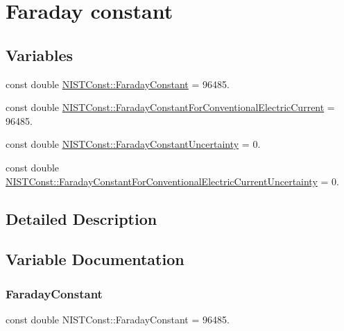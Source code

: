 \hypertarget{group___faraday_constant}{}\section{Faraday constant}
\label{group___faraday_constant}
\subsection*{Variables}
\begin{DoxyCompactItemize}
\item 
const double \hyperlink{group___faraday_constant_ga3a2104c5d85a6e687d615ec8004aa4c5}{N\+I\+S\+T\+Const\+::\+Faraday\+Constant} = 96485.
\item 
const double \hyperlink{group___faraday_constant_ga06079db2ebfcb103460b80a977171ac0}{N\+I\+S\+T\+Const\+::\+Faraday\+Constant\+For\+Conventional\+Electric\+Current} = 96485.
\item 
const double \hyperlink{group___faraday_constant_ga9b0f9181caac73b346e91602673272c1}{N\+I\+S\+T\+Const\+::\+Faraday\+Constant\+Uncertainty} = 0.
\item 
const double \hyperlink{group___faraday_constant_ga3b9280c2cf0f28e5ec6122b2f585eb81}{N\+I\+S\+T\+Const\+::\+Faraday\+Constant\+For\+Conventional\+Electric\+Current\+Uncertainty} = 0.
\end{DoxyCompactItemize}


\subsection{Detailed Description}


\subsection{Variable Documentation}
\mbox{\label{group___faraday_constant_ga3a2104c5d85a6e687d615ec8004aa4c5}} 
\subsubsection{\texorpdfstring{Faraday\+Constant}{FaradayConstant}}
{\footnotesize\ttfamily const double N\+I\+S\+T\+Const\+::\+Faraday\+Constant = 96485.}


